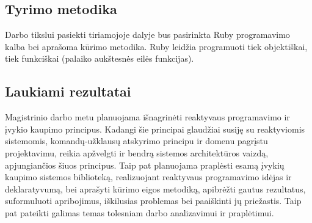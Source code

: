 
\subsection{Tyrimo metodika}

    Darbo tikslui pasiekti tiriamojoje dalyje bus pasirinkta Ruby programavimo kalba bei aprašoma kūrimo metodika. Ruby leidžia programuoti tiek objektiškai, tiek funkciškai (palaiko aukštesnės eilės funkcijas).

\subsection{Laukiami rezultatai}

    Magistrinio darbo metu planuojama išnagrinėti reaktyvaus programavimo ir įvykio kaupimo principus. Kadangi šie principai glaudžiai susiję su reaktyviomis sistemomis, komandų-užklausų atskyrimo principu ir domenu pagrįstu projektavimu, reikia apžvelgti ir bendrą sistemos architektūros vaizdą, apjungiančios šiuos principus. Taip pat planuojama praplėsti esamą įvykių kaupimo sistemos biblioteką, realizuojant reaktyvaus programavimo idėjas ir deklaratyvumą, bei aprašyti kūrimo eigos metodiką, apibrėžti gautus rezultatus, suformuluoti apribojimus, iškilusias problemas bei paaiškinti jų priežastis. Taip pat pateikti galimas temas tolesniam darbo analizavimui ir praplėtimui.

